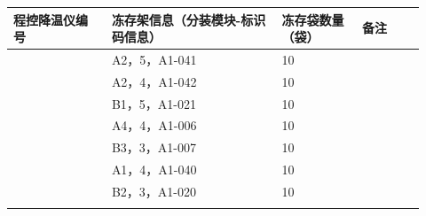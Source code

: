 \documentclass[UTF8,10pt,a4paper,fontset=fandol]{ctexart}
\newcommand{\fieldvalue}[1]{#1}
\newcommand{\handwritten}[1]{#1}
\begin{document}
\begin{center}
\small
\begin{tabular}{|p{0.22\linewidth}|p{0.38\linewidth}|p{0.18\linewidth}|p{0.14\linewidth}|}
\hline
\centering 程控降温仪编号 &
\centering 冻存架信息（分装模块-标识码信息） &
\centering 冻存袋数量（袋） &
\centering 备注\\
\hline
\multirow{9}{*}{\centering\fieldvalue{\handwritten{112038}}}
&
\fieldvalue{\handwritten{A2，5，A1-041}}
&
\fieldvalue{\handwritten{10}} &\\
\cline{2-4}
&
\fieldvalue{\handwritten{A2，4，A1-042}}
&
\fieldvalue{\handwritten{10}} &\\
\cline{2-4}
&
\fieldvalue{\handwritten{B1，5，A1-021}}
&
\fieldvalue{\handwritten{10}} &\\
\cline{2-4}
&
\fieldvalue{\handwritten{A4，4，A1-006}}
&
\fieldvalue{\handwritten{10}} &\\
\cline{2-4}
&
\fieldvalue{\handwritten{B3，3，A1-007}}
&
\fieldvalue{\handwritten{10}} &\\
\cline{2-4}
&
\fieldvalue{\handwritten{A1，4，A1-040}}
&
\fieldvalue{\handwritten{10}} &\\
\cline{2-4}
&
\fieldvalue{\handwritten{B2，3，A1-020}}
&
\fieldvalue{\handwritten{10}} &\\
\cline{2-4}
&

\end{tabular}
\end{center}
\end{document}
